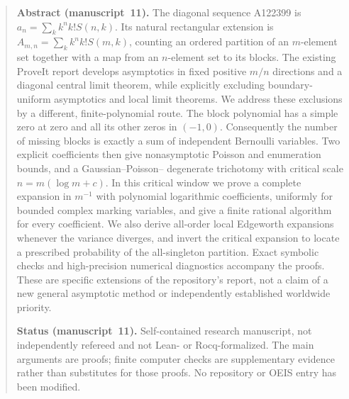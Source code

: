\documentclass[11pt,letterpaper]{article}
\numberwithin{equation}{subsection}
\theoremstyle{definition}
\theoremstyle{remark}
\theoremstyle{plain}
\begin{document}
\begin{quote}\small
\textbf{Abstract (manuscript~11).} The diagonal sequence A122399 is
$a_n=\sum_k k^n k!S(n,k)$. Its natural rectangular extension is
$A_{m,n}=\sum_k k^n k!S(m,k)$, counting an ordered partition of an
$m$-element set together with a map from an $n$-element set to its blocks.
The existing ProveIt report develops asymptotics in fixed positive
$ m/n$ directions and a diagonal central limit theorem, while explicitly
excluding boundary-uniform asymptotics and local limit theorems.
We address these exclusions by a different, finite-polynomial route.
The block polynomial has a simple zero at zero and all its other zeros
in $(-1,0)$. Consequently the number of missing blocks is exactly a sum
of independent Bernoulli variables. Two explicit coefficients then give
nonasymptotic Poisson and enumeration bounds, and a Gaussian--Poisson--
degenerate trichotomy with critical scale $n=m(\log m+c)$.
In this critical window we prove a complete expansion in
$m^{-1}$ with polynomial logarithmic coefficients, uniformly for bounded
complex marking variables, and give a finite rational algorithm for every
coefficient. We also derive all-order local Edgeworth expansions whenever
the variance diverges, and invert the critical expansion to locate a
prescribed probability of the all-singleton partition. Exact symbolic
checks and high-precision numerical diagnostics accompany the proofs.
These are specific extensions of the repository's report, not a claim of
a new general asymptotic method or independently established worldwide
priority.

\textbf{Status (manuscript~11).} Self-contained research manuscript, not
independently refereed and not Lean- or Rocq-formalized. The main
arguments are proofs; finite computer checks are supplementary evidence
rather than substitutes for those proofs. No repository or OEIS entry
has been modified.
\end{quote}
\end{document}
